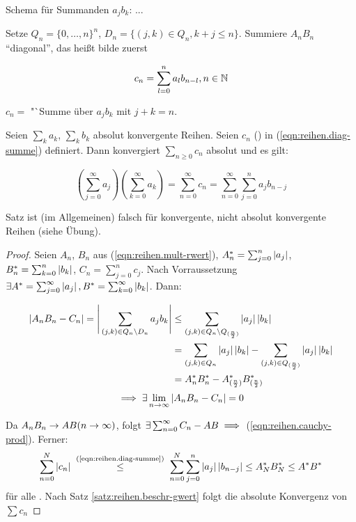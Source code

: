 \documentclass[12pt]{scrreprt}
\begin{document}
Schema für Summanden $a_jb_k$:
...

Setze $Q_n = \{0, \dotsc, n\}^n$, $D_n = \{(j, k) \in Q_n, k+j \le n\}$.
Summiere $A_nB_n$ "`diagonal"', das heißt bilde zuerst

\begin{equation}\label{eqn:reihen.diag-summe}
c_n = \sum_{l=0}^n a_lb_{n-l}, n \in \mathbb{N}
\end{equation}

$c_n = $ "`Summe über $a_jb_k$ mit $j+k = n$.

\begin{satz}\label{satz:reihen.cauchy-prod}
Seien $\sum_k a_k$, $\sum_k b_k$ absolut konvergente Reihen. Seien $c_n$ () in (\ref{eqn:reihen.diag-summe}) definiert.
Dann konvergiert $\sum_{n\ge0} c_n$ absolut und es gilt:

\begin{equation}\label{eqn:reihen.cauchy-prod}
\left(\sum_{j=0}^\infty a_j\right)\left(\sum_{k=0}^\infty a_k\right) = \sum_{n=0}^\infty c_n = \sum_{n=0}^\infty \sum_{j=0}^n a_jb_{n-j}
\end{equation}
\end{satz}

\begin{bem*}
Satz ist (im Allgemeinen) falsch für konvergente, nicht absolut konvergente Reihen (siehe Übung).
\end{bem*}

\begin{proof}
Seien $A_n$, $B_n$ aus (\ref{eqn:reihen.mult-rwert}), $A_n^* = \sum_{j=0}^n \left\lvert a_j\right\lvert$, $B_n^* = \sum_{k=0}^n \left\lvert b_k\right\lvert$,
$C_n = \sum_{j=0}^n c_j$. Nach Vorraussetzung $\exists A^* = \sum_{j=0}^\infty \left\lvert a_j\right\lvert, B^* = \sum_{k=0}^\infty \left\lvert b_k\right\lvert$.
Dann:

\begin{align*}
\left\lvert A_nB_n - C_n\right\lvert = \Bigg\lvert\sum_{(j,k)\in Q_n\backslash D_n} a_jb_k\Bigg\lvert &\le 
	\sum_{(j,k)\in Q_n\backslash Q_{(\frac{n}{2})}} \left\lvert a_j\right\lvert\left\lvert b_k\right\lvert \\
	&= \sum_{(j,k)\in Q_n} \left\lvert a_j\right\lvert\left\lvert b_k\right\lvert - \sum_{(j,k)\in Q_{(\frac{n}{2})}} \left\lvert a_j\right\lvert\left\lvert b_k\right\lvert\\
	&= A_n^*B_n^* - A_{(\frac{n}{2})}^*B_{(\frac{n}{2})}^*
\end{align*}
\[\implies \exists\lim_{n\rightarrow\infty} \left\lvert A_nB_n - C_n\right\lvert = 0\]

Da $A_nB_n \rightarrow AB (n\rightarrow\infty)$, folgt $\exists\sum_{n=0}^\infty C_n - AB \implies$ (\ref{eqn:reihen.cauchy-prod}).
Ferner: \[\sum_{n=0}^N \abs{c_n} \nach{\le}{(\ref{eqn:reihen.diag-summe})}
\sum_{n=0}^N\sum_{j=0}^n \abs{a_j}\abs{b_{n-j}} \le %
A_N^*B_N^* \le A^*B^*\] für alle . Nach Satz \ref{satz:reihen.beschr-gwert} folgt die absolute Konvergenz von $\sum c_n$
\end{proof}
\end{document}

